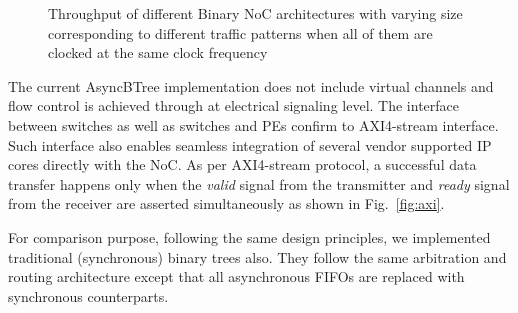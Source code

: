 \begin{figure}[t]
\centering     %
{}
\caption{Throughput of different Binary NoC architectures with varying size corresponding to different traffic patterns when all of them 
are clocked at the same clock frequency}
\label{fig:latency}
\end{figure}


The current AsyncBTree implementation does not include virtual channels and flow control is achieved through at electrical signaling level.
The interface between switches as well as switches and PEs confirm to AXI4-stream interface.
Such interface also enables seamless integration of several vendor supported IP cores directly with the NoC.
As per AXI4-stream protocol, a successful data transfer happens only when the \emph{valid} signal from the transmitter and \emph{ready} signal from the receiver are asserted simultaneously as shown in Fig.~\ref{fig:axi}.

For comparison purpose, following the same design principles, we implemented traditional (synchronous) binary trees also.
They follow the same arbitration and routing architecture except that all asynchronous FIFOs are replaced with synchronous counterparts.
